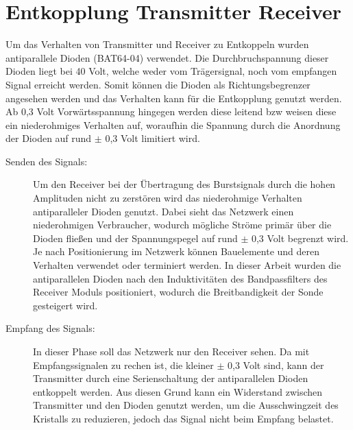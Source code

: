 \section{Entkopplung Transmitter Receiver}
Um das Verhalten von Transmitter und Receiver zu Entkoppeln wurden antiparallele Dioden (BAT64-04) verwendet. Die Durchbruchspannung dieser Dioden liegt bei 40 Volt, welche weder vom Trägersignal, noch vom empfangen Signal erreicht werden. Somit können die Dioden als Richtungsbegrenzer angesehen werden und das Verhalten kann für die Entkopplung genutzt werden. Ab 0,3 Volt Vorwärtsspannung hingegen werden diese leitend \ac{bzw} weisen diese ein niederohmiges Verhalten auf, woraufhin die Spannung durch die Anordnung der Dioden auf rund $\pm$ 0,3 Volt limitiert wird.\cite{bat64}
\begin{description}
\item[Senden des Signals:] Um den Receiver bei der Übertragung des Burstsignals durch die hohen Amplituden nicht zu zerstören wird das niederohmige Verhalten antiparalleler Dioden genutzt. Dabei sieht das Netzwerk einen niederohmigen Verbraucher, wodurch mögliche Ströme primär über die Dioden fließen und der Spannungspegel auf rund $\pm$ 0,3 Volt begrenzt wird. Je nach Positionierung im Netzwerk können Bauelemente und deren Verhalten verwendet oder terminiert werden. In dieser Arbeit wurden die antiparallelen Dioden nach den Induktivitäten des Bandpassfilters des Receiver Moduls positioniert, wodurch die Breitbandigkeit der Sonde gesteigert wird.
\item[Empfang des Signals:] In dieser Phase soll das Netzwerk nur den Receiver sehen. Da mit Empfangssignalen zu rechen ist, die kleiner $\pm$ 0,3 Volt sind, kann der Transmitter durch eine Serienschaltung der antiparallelen Dioden entkoppelt werden. Aus diesen Grund kann ein Widerstand zwischen Transmitter und den Dioden genutzt werden, um die Ausschwingzeit des Kristalls zu reduzieren, jedoch das Signal nicht beim Empfang belastet.
\end{description}
